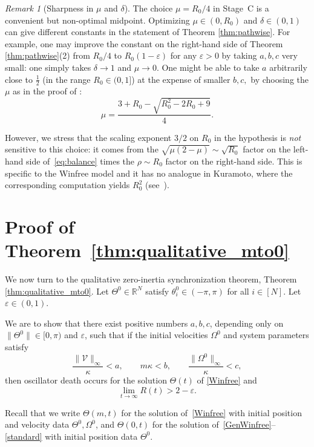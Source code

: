 \documentclass[11pt,reqno]{amsart}
\newcommand{\R}{\mathbb{R}}
\theoremstyle{definition}
\theoremstyle{remark}
\newtheorem{remark}[lemma]{Remark}
\begin{document}
\begin{remark}[Sharpness in $\mu$ and $\delta$]\label{rmk:R032}
The choice $\mu=R_0/4$ in Stage~C is a convenient but non-optimal
midpoint. Optimizing $\mu\in(0,R_0)$ and $\delta\in (0,1)$ can give different constants in the statement of Theorem \ref{thm:pathwise}. For example, one may improve the
constant on the right-hand side of Theorem \ref{thm:pathwise}(2) from $R_0/4$ to
$R_0(1-\varepsilon)$ for any $\varepsilon>0$ by taking $a,b,c$ very small: one simply takes $\delta\to 1$ and $\mu\to 0$. One might be able to take $a$ arbitrarily close to $\frac 12$ (in the range $R_0\in (0,1]$) at the expense of smaller $b,c,$ by choosing the $\mu$ as in the proof of \cite[Corollary 16]{ryoo2026oscillator}:
\[
\mu = \frac{3+R_0-\sqrt{R_0^2-2R_0+9}}{4}.
\]

However, we stress that the scaling exponent $3/2$ on
$R_0$ in the hypothesis is \emph{not} sensitive to this choice: it
comes from the $\sqrt{\mu(2-\mu)}\sim\sqrt{R_0}$ factor on the
left-hand side of~\eqref{eq:balance} times the $\rho\sim R_0$ factor on
the right-hand side. This is specific to the Winfree model and it has
no analogue in Kuramoto, where the corresponding computation yields
$R_0^{2}$ (see~\cite[Theorem~1.1]{cho2025quantitative}).
\end{remark}

\section{Proof of Theorem~\ref{thm:qualitative_mto0}}\label{sec:qualitative}

We now turn to the qualitative zero-inertia synchronization theorem, Theorem \ref{thm:qualitative_mto0}. Let $\Theta^0\in\R^N$ satisfy $\theta_i^0\in (-\pi,\pi)$ for all $i\in [N]$. Let $\varepsilon\in (0,1)$.

We are to show that there exist positive numbers $a,b,c$, depending only on $\|\Theta^0\|\in [0,\pi)$ and
$\varepsilon$, such that if the initial velocities $\Omega^0$ and
system parameters satisfy
\begin{equation}\label{eq:qual-abc}
	\frac{\|\mathcal{V}\|_\infty}{\kappa}<a,\qquad
m\kappa<b,\qquad 	\frac{\|\Omega^0\|_\infty}{\kappa}<c,
\end{equation}
then oscillator death occurs for the solution $\Theta(t)$ of
\eqref{Winfree} and
\[
\lim_{t\to\infty}R(t)>2-\varepsilon.
\]

Recall that we write $\Theta(m,t)$ for the solution of~\eqref{Winfree} with initial position and velocity data $\Theta^0,\Omega^0$, and $\Theta(0,t)$ for the solution of~\eqref{GenWinfree}--\eqref{standard} with initial
position data $\Theta^0$.
\end{document}
